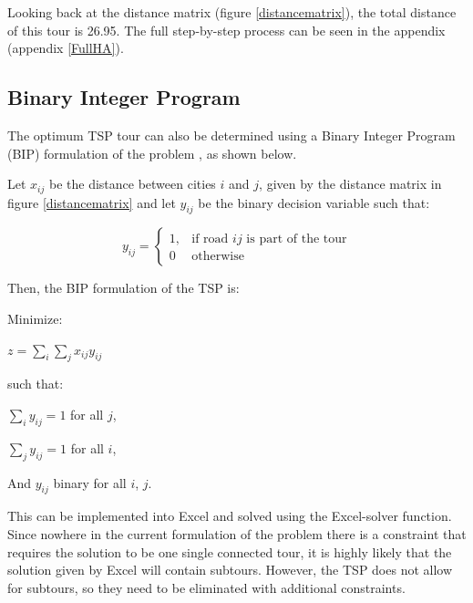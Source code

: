 \noindent
Looking back at the distance matrix (figure \ref{distancematrix}), the total distance of this tour is 26.95. \noindent The full step-by-step process can be seen in the appendix (appendix \ref{FullHA}).

\subsection{Binary Integer Program}
\label{BIP}

The optimum TSP tour can also be determined using a Binary Integer Program (BIP) formulation of the problem \cite{ORlecture}, as shown below.

\vspace{5mm}
\noindent Let $x_{ij}$ be the distance between cities $i$ and $j$, given by the distance matrix in figure \ref{distancematrix} and let $y_{ij}$ be the binary decision variable such that:

\[
y_{ij}= 
\begin{cases}
1, & \text{if road $ij$ is part of the tour}\\
0 & \text{otherwise}
\end{cases}
\]
	
\vspace{5mm}
\noindent
Then, the BIP formulation of the TSP is:
\vspace{5mm}	

\noindent
Minimize:

\vspace{-3mm}	
\begin{center}
$z = \sum_{i} \sum_{j} x_{ij}y_{ij}$
\end{center}	 

\noindent
such that:
\vspace{-3mm}	
\begin{center}
	$\sum_{i} y_{ij}=1$ for all $j$,

	\vspace{2mm}
	$\sum_{j} y_{ij}=1$ for all $i$,

	\vspace{2mm}
	And $y_{ij}$ binary for all $i$, $j$.
\end{center}	
	
\vspace{3mm}	
This can be implemented into Excel and solved using the Excel-solver function. Since nowhere in the current formulation of the problem there is a constraint that requires the solution to be one single connected tour, it is highly likely that the solution given by Excel will contain subtours. However, the TSP does not allow for subtours, so they need to be eliminated with additional constraints.

